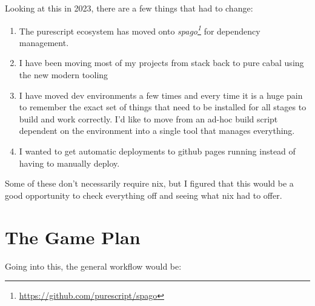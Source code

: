 \documentclass[]{article}
\renewcommand{\href}[2]{#2\footnote{\url{#1}}}
\begin{document}
Looking at this in 2023, there are a few things that had to change:

\begin{enumerate}
\def\labelenumi{\arabic{enumi}.}
\tightlist
\item
  The purescript ecosystem has moved onto
  \emph{\href{https://github.com/purescript/spago}{spago}} for dependency
  management.
\item
  I have been moving most of my projects from stack back to pure cabal using the
  new modern tooling
\item
  I have moved dev environments a few times and every time it is a huge pain to
  remember the exact set of things that need to be installed for all stages to
  build and work correctly. I'd like to move from an ad-hoc build script
  dependent on the environment into a single tool that manages everything.
\item
  I wanted to get automatic deployments to github pages running instead of
  having to manually deploy.
\end{enumerate}

Some of these don't necessarily require nix, but I figured that this would be a
good opportunity to check everything off and seeing what nix had to offer.

\section{The Game Plan}\label{the-game-plan}

Going into this, the general workflow would be:
\end{document}
